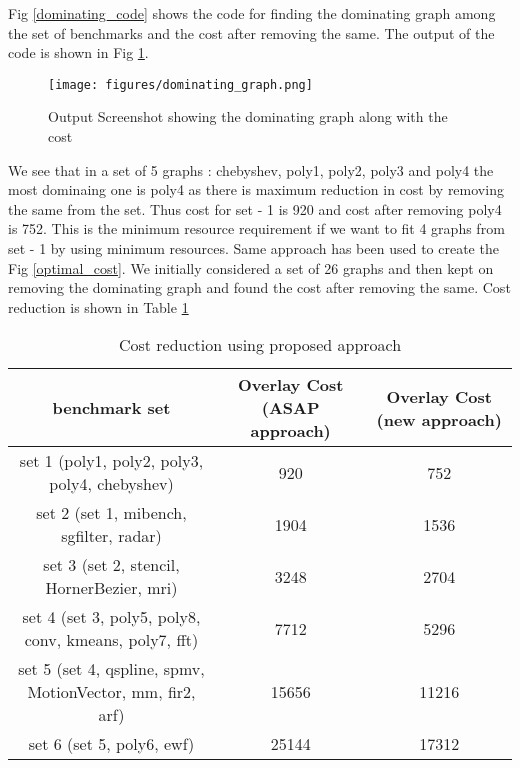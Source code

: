 

Fig \ref{dominating_code} shows the code for finding the dominating graph among the set of benchmarks and the cost after removing the same. The output of the code is shown in Fig \ref{dominating_graph}.


\begin{figure}[!h]
	\centering
	\texttt{[image: figures/dominating\_graph.png]}
	\caption{Output Screenshot showing the dominating graph along with the cost} %
	\label{dominating_graph}
\end{figure}

 We see that in a set of 5 graphs : chebyshev, poly1, poly2, poly3 and poly4 the most dominaing one is poly4 as there is maximum reduction in cost by removing the same from the set. Thus cost for set - 1 is 920 and cost after removing poly4 is 752. This is the minimum resource requirement if we want to fit 4 graphs from set - 1 by using minimum resources. Same approach has been used to create the Fig \ref{optimal_cost}. 
 We initially considered a set of 26 graphs and then kept on removing the dominating graph and found the cost after removing the same. Cost reduction is shown in Table \ref{costreduction}




\begin{table}[!h]
	\renewcommand{\arraystretch}{1.3}
	\caption{Cost reduction using proposed approach}
	\label{costreduction}
	\centering
	\scriptsize
	\begin{tabular}{ccc}
		\toprule
		benchmark set 																& Overlay Cost (ASAP approach)	& Overlay Cost (new approach)		\\
		\midrule                                                                                                
		set 1 (poly1, poly2, poly3, poly4, chebyshev)   							& 920                     		& 752                     			\\
		set 2 (set 1, mibench, sgfilter, radar)			       						& 1904                          & 1536                              \\                           
		set 3 (set 2, stencil, HornerBezier, mri)		             				& 3248                          & 2704                              \\
		set 4 (set 3, poly5, poly8, conv, kmeans, poly7, fft) 						& 7712 							& 5296 								\\
		set 5 (set 4, qspline, spmv, MotionVector, mm, fir2, arf) 					& 15656 						& 11216 							\\ 
		set 6 (set 5, poly6, ewf)   												& 25144                         & 17312                             \\
		\bottomrule                                                                             
		
	\end{tabular}
\end{table}



